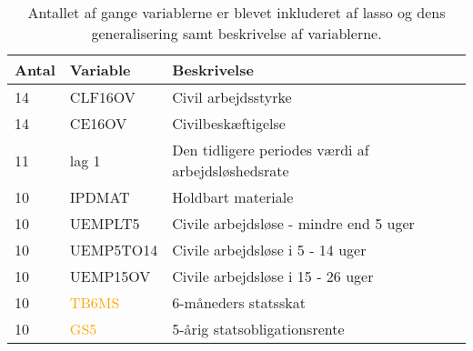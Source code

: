 \begin{table}[ht] 
\centering 
\begin{tabular}{lll}
\toprule 
Antal & Variable & Beskrivelse \\ \midrule
14 &\textcolor{blue3}{CLF16OV} & Civil arbejdsstyrke \\
14 &\textcolor{blue3}{CE16OV} & Civilbeskæftigelse \\
11 & \textcolor{blue3}{lag 1} & Den tidligere periodes værdi af arbejdsløshedsrate \\
10 & \textcolor{chartreuse4}{IPDMAT} & Holdbart materiale  \\
10 & \textcolor{blue3}{UEMPLT5} & Civile arbejdsløse - mindre end 5 uger \\
10 & \textcolor{blue3}{UEMP5TO14}& Civile arbejdsløse i 5 - 14 uger \\
10 & \textcolor{blue3}{UEMP15OV} &  Civile arbejdsløse i 15 - 26 uger  \\
10 & \textcolor{orange}{TB6MS} & 6-måneders statsskat  \\
10 & \textcolor{orange}{GS5} & 5-årig statsobligationsrente \\
\bottomrule
\end{tabular}  
\caption{Antallet af gange variablerne er blevet inkluderet af lasso og dens generalisering samt beskrivelse af variablerne.} \label{tab:topvariable}
\end{table} 